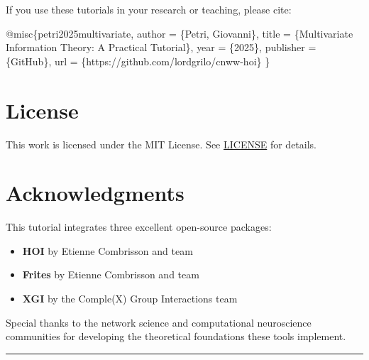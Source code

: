 \documentclass[
  11pt,
  letterpaper,
  oneside,
  openany]{book}
\newenvironment{Shaded}{\begin{snugshade}}{\end{snugshade}}
\newcommand{\DataTypeTok}[1]{\textcolor[rgb]{0.68,0.00,0.00}{#1}}
\newcommand{\NormalTok}[1]{\textcolor[rgb]{0.00,0.23,0.31}{#1}}
\newcommand{\OtherTok}[1]{\textcolor[rgb]{0.00,0.23,0.31}{#1}}
\newcommand{\VariableTok}[1]{\textcolor[rgb]{0.07,0.07,0.07}{#1}}
\providecommand{\tightlist}{%
  \setlength{\itemsep}{0pt}\setlength{\parskip}{0pt}}
\begin{document}
If you use these tutorials in your research or teaching, please cite:

\begin{Shaded}
\begin{Highlighting}[]
\VariableTok{@misc}\NormalTok{\{}\OtherTok{petri2025multivariate}\NormalTok{,}
  \DataTypeTok{author}\NormalTok{ = \{Petri, Giovanni\},}
  \DataTypeTok{title}\NormalTok{ = \{Multivariate Information Theory: A Practical Tutorial\},}
  \DataTypeTok{year}\NormalTok{ = \{2025\},}
  \DataTypeTok{publisher}\NormalTok{ = \{GitHub\},}
  \DataTypeTok{url}\NormalTok{ = \{https://github.com/lordgrilo/cnww{-}hoi\}}
\NormalTok{\}}
\end{Highlighting}
\end{Shaded}

\section*{License}\label{license}


This work is licensed under the MIT License. See \url{LICENSE} for
details.

\section*{Acknowledgments}\label{acknowledgments}


This tutorial integrates three excellent open-source packages:

\begin{itemize}
\tightlist
\item
  \textbf{HOI} by Etienne Combrisson and team
\item
  \textbf{Frites} by Etienne Combrisson and team\\
\item
  \textbf{XGI} by the Comple(X) Group Interactions team
\end{itemize}

Special thanks to the network science and computational neuroscience
communities for developing the theoretical foundations these tools
implement.

\begin{center}\rule{0.5\linewidth}{0.5pt}\end{center}
\end{document}
